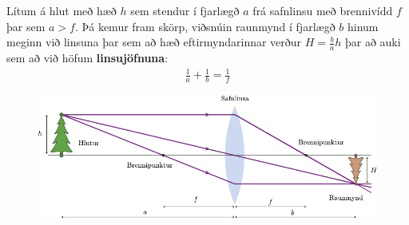 \begin{tcolorbox}
\begin{theorem}
Lítum á hlut með hæð $h$ sem stendur í fjarlægð $a$ frá safnlinsu með brennivídd $f$ þar sem $a>f$. Þá kemur fram skörp, viðsnúin raunmynd í fjarlægð $b$ hinum meginn við linsuna þar sem að hæð eftirmyndarinnar verður $H = \frac{b}{a}h$ þar að auki sem að við höfum \textbf{linsujöfnuna}:
\begin{align*}
    \frac{1}{a} + \frac{1}{b} = \frac{1}{f}
\end{align*}
\begin{figure}[H]
    \centering
    \includegraphics{figures/safnlinsa-raunmynd.pdf}
\end{figure}
\end{theorem}
\end{tcolorbox}


